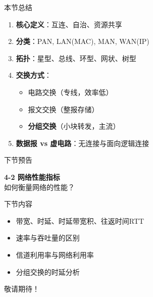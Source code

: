 \documentclass[10pt, aspectratio=169]{beamer}
\begin{document}
\begin{frame}{本节总结}
    \begin{enumerate}
        \item \textbf{核心定义}：互连、自治、资源共享
        \item \textbf{分类}：PAN, LAN(MAC), MAN, WAN(IP)
        \item \textbf{拓扑}：星型、总线、环型、网状、树型
        \item \textbf{交换方式}：
        \begin{itemize}
            \item 电路交换（专线，效率低）
            \item 报文交换（整报存储）
            \item \textbf{分组交换}（小块转发，主流）
        \end{itemize}
        \item \textbf{数据报 vs 虚电路}：无连接与面向逻辑连接
    \end{enumerate}
\end{frame}

\begin{frame}{下节预告}
    \begin{center}
    \vspace{1em}
    {\Large \textbf{4-2 网络性能指标}}\\
    \vspace{0.3em}
    \textcolor{408blue}{如何衡量网络的性能？}
    \vspace{1em}
    \end{center}
    \begin{block}{下节内容}
        \begin{itemize}
            \item 带宽、时延、时延带宽积、往返时间RTT
            \item 速率与吞吐量的区别
            \item 信道利用率与网络利用率
            \item 分组交换的时延分析
        \end{itemize}
    \end{block}
    \vspace{0.5em}
    \begin{center}
        \textcolor{408orange}{敬请期待！}
    \end{center}
\end{frame}
\end{document}
